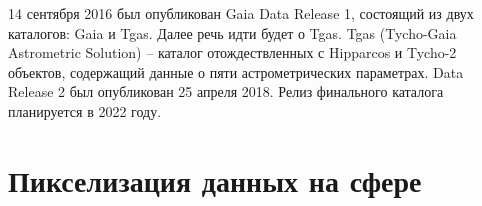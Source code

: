 \documentclass[14pt]{article} %
\begin{document}
14 сентября 2016 был опубликован Gaia Data Release 1, состоящий из двух каталогов: Gaia и Tgas. Далее речь идти будет о Tgas. Tgas (Tycho-Gaia Astrometric Solution) -- каталог отождествленных с Hipparcos и Tycho-2 объектов, содержащий данные о пяти астрометрических параметрах. Data Release 2 был опубликован 25 апреля 2018. Релиз финального каталога планируется в 2022 году.







\section{Пикселизация данных на сфере}
\end{document}
